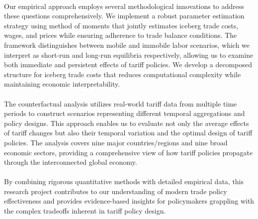 \paragraph{} Our empirical approach employs several methodological innovations to address these questions comprehensively. We implement a robust parameter estimation strategy using method of moments that jointly estimates iceberg trade costs, wages, and prices while ensuring adherence to trade balance conditions. The framework distinguishes between mobile and immobile labor scenarios, which we interpret as short-run and long-run equilibria respectively, allowing us to examine both immediate and persistent effects of tariff policies. We develop a decomposed structure for iceberg trade costs that reduces computational complexity while maintaining economic interpretability.

\paragraph{} The counterfactual analysis utilizes real-world tariff data from multiple time periods to construct scenarios representing different temporal aggregations and policy designs. This approach enables us to evaluate not only the average effects of tariff changes but also their temporal variation and the optimal design of tariff policies. The analysis covers nine major countries/regions and nine broad economic sectors, providing a comprehensive view of how tariff policies propagate through the interconnected global economy.

\paragraph{} By combining rigorous quantitative methods with detailed empirical data, this research project contributes to our understanding of modern trade policy effectiveness and provides evidence-based insights for policymakers grappling with the complex tradeoffs inherent in tariff policy design.
